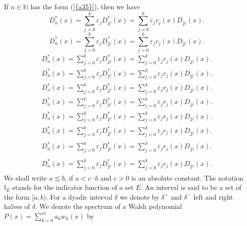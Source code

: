 \documentclass{amsart}
\numberwithin{equation}{section}
\begin{document}
If $n\in {\ensuremath{\mathbb N}}$ has the form {(\ref{{a35}})}, then we have
{
\begin{equation*} 
D_n^*(x)=\sum_{j=0}^k\varepsilon_jD_{2^j}^*(x)=\sum_{j=0}^k\varepsilon_jr_j(x)D_{2^j}(x).
 \end{equation*}\fi  
{}\begin{equation}
D_n^*(x)=\sum_{j=0}^k\varepsilon_jD_{2^j}^*(x)=\sum_{j=0}^k\varepsilon_jr_j(x)D_{2^j}(x).
\end{equation}\fi   
{}\begin{align*}
D_n^*(x)=\sum_{j=0}^k\varepsilon_jD_{2^j}^*(x)=\sum_{j=0}^k\varepsilon_jr_j(x)D_{2^j}(x).
\end{align*}\fi   
{}\begin{align}
D_n^*(x)=\sum_{j=0}^k\varepsilon_jD_{2^j}^*(x)=\sum_{j=0}^k\varepsilon_jr_j(x)D_{2^j}(x).
\end{align}\fi    
{}\begin{gather*}
D_n^*(x)=\sum_{j=0}^k\varepsilon_jD_{2^j}^*(x)=\sum_{j=0}^k\varepsilon_jr_j(x)D_{2^j}(x).
\end{gather*}\fi  
{}\begin{gather}
D_n^*(x)=\sum_{j=0}^k\varepsilon_jD_{2^j}^*(x)=\sum_{j=0}^k\varepsilon_jr_j(x)D_{2^j}(x).
\end{gather}\fi   
{}\begin{multline*}
D_n^*(x)=\sum_{j=0}^k\varepsilon_jD_{2^j}^*(x)=\sum_{j=0}^k\varepsilon_jr_j(x)D_{2^j}(x).
\end{multline*}\fi  
{}\begin{multline}
D_n^*(x)=\sum_{j=0}^k\varepsilon_jD_{2^j}^*(x)=\sum_{j=0}^k\varepsilon_jr_j(x)D_{2^j}(x).
\end{multline}\fi  
{}\begin{multline*}\begin{split}
D_n^*(x)=\sum_{j=0}^k\varepsilon_jD_{2^j}^*(x)=\sum_{j=0}^k\varepsilon_jr_j(x)D_{2^j}(x).
\end{split}\end{multline*}\fi
{}\begin{multline}\begin{split}
D_n^*(x)=\sum_{j=0}^k\varepsilon_jD_{2^j}^*(x)=\sum_{j=0}^k\varepsilon_jr_j(x)D_{2^j}(x).
\end{split}\end{multline}\fi
}
We shall write $a\lesssim b$, if $a<c\cdot b$ and $c>0$ is an absolute constant. The notation ${\ensuremath{\mathbb I}}_E$  stands for the indicator function of a set $E$.  An interval is said to be a set of the form $[a,b)$. For a dyadic interval $\delta$ we denote by $\delta^+$ and $\delta^-$ left and right halves of $\delta$. We denote the spectrum of a Walsh polynomial $P(x)=\sum_{k=0}^m a_kw_k(x)$  by
\end{document}
